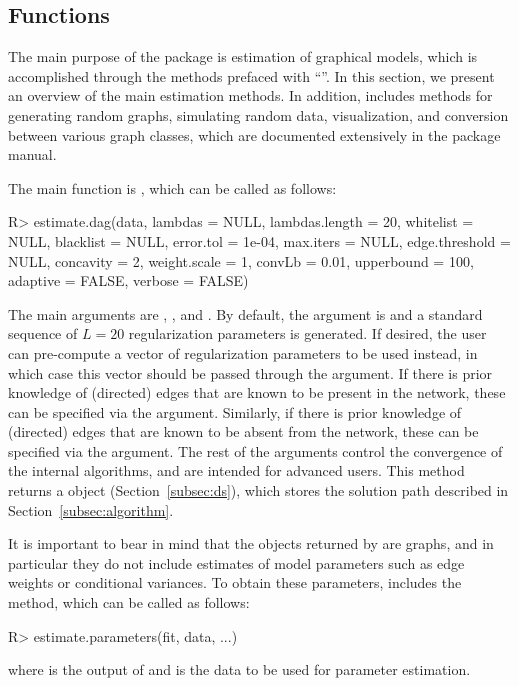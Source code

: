 \documentclass[article]{jss}
\renewcommand{\|}{\,|\,}
\begin{document}
\subsection{Functions}
\label{subsec:functions}

The main purpose of the  package is estimation of graphical models, which is accomplished through the methods prefaced with ``''. In this section, we present an overview of the main estimation methods. In addition,  includes methods for generating random graphs, simulating random data, visualization, and conversion between various graph classes, which are documented extensively in the package manual.

The main function is , which can be called as follows:
%
\begin{CodeChunk}
\begin{CodeInput}
R> estimate.dag(data, lambdas = NULL, lambdas.length = 20, whitelist = NULL,
    blacklist = NULL, error.tol = 1e-04, max.iters = NULL,
    edge.threshold = NULL, concavity = 2, weight.scale = 1, convLb = 0.01,
    upperbound = 100, adaptive = FALSE, verbose = FALSE)
\end{CodeInput}
\end{CodeChunk}
%
The main arguments are , , and . By default, the  argument is  and a standard sequence of $L=20$ regularization parameters is generated. If desired, the user can pre-compute a vector of regularization parameters to be used instead, in which case this vector should be passed through the  argument. If there is prior knowledge of (directed) edges that are known to be present in the network, these can be specified via the  argument. Similarly, if there is prior knowledge of (directed) edges that are known to be absent from the network, these can be specified via the  argument. The rest of the arguments control the convergence of the internal algorithms, and are  intended for advanced users. This method returns a  object (Section~\ref{subsec:ds}), which stores the solution path described in Section~\ref{subsec:algorithm}. 

It is important to bear in mind that the objects returned by  are graphs, and in particular they do not include estimates of model parameters such as edge weights or conditional variances. To obtain these parameters,  includes the  method, which can be called as follows:
%
\begin{CodeChunk}
\begin{CodeInput}
R> estimate.parameters(fit, data, ...)
\end{CodeInput}
\end{CodeChunk}
%
where  is the output of  and  is the data to be used for parameter estimation.
\end{document}
